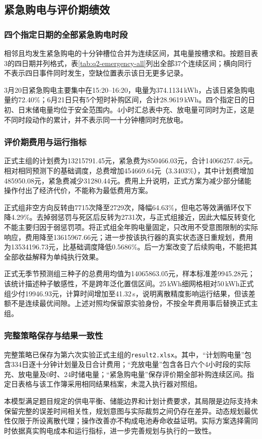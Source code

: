 
\subsection{紧急购电与评价期绩效}
\subsubsection{四个指定日期的全部紧急购电时段}

相邻且均发生紧急购电的十分钟槽位合并为连续区间，其电量按槽求和。按题目表3的四日期并列格式，表\ref{tab:q2-emergency-all}列出全部37个连续区间；横向同行不表示四日事件同时发生，空缺位置表示该日无更多记录。


3月20日紧急购电主要集中在15:20--16:20，电量为374.1134\,kWh，占该日紧急购电量约72.40\%；6月21日只有5个短时补购区间，合计28.9619\,kWh。四个指定日的日初、日末储电量均位于安全范围内。4小时汇总表中充、放电量可同时为正，这是不同时段动作的累计，并不表示同一十分钟槽同时充放电。

\subsubsection{评价期费用与运行指标}


正式主组的计划费为13215791.45元，紧急费为850466.03元，合计14066257.48元。相对相同预测下的基础调度，总费增加454669.64元（3.3403\%），其中计划费增加485950.08元，紧急费减少31280.44元。费用上升说明，正式方案为减少部分储能操作付出了经济代价，不能称为最低费用方案。

正式组非空方向反转由7715次降至2729次，降幅64.63\%，但电芯等效满循环仅下降4.29\%。去掉弱惩罚与死区后反转为2731次，与正式组接近，因此大幅反转变化不能主要归因于弱惩罚项。将正式组全年购电量固定，只改用不受意图限制的实际响应，费用降至13615967.66元；进一步按该执行器的真实状态逐日重规划，费用为13534196.73元，比基础调度降低0.5686\%。后一方案改变了后续购电，不能把其全部收益解释为单纯执行效果。

正式无季节预测组三种子的总费用均值为14065863.05元，样本标准差9945.28元；该统计描述种子敏感性，不是跨年泛化置信区间。25\,kWh细网格相对50\,kWh正式组少付19946.93元，计算时间增加至41.32\,s，说明离散精度影响运行结果，但该差额不是连续最优间隙。上述对照均保留原实验身份，不按全年费用事后替换正式主组。

\subsubsection{完整策略保存与结果一致性}

完整策略已保存为第六次实验正式主组的\texttt{result2.xlsx}。其中，“计划购电量”包含334日逐十分钟计划量及日合计费用；“充放电量”包含各日六个4小时段的实际充、放电量及0时、24时储电量；“紧急购电量”保存评价期全部补购连续区间。指定日表格与该工作簿采用相同结果档案，未混入执行器对照组。

本模型满足题目规定的供电平衡、储能边界和计划计费要求，其局限是边际支持未保留完整的误差时间相关性，规划意图与实际裁剪之间仍存在差异。动态规划最优性仅限于所设离散代理；操作改善亦不构成电池寿命收益证明。实际方案选择需同时依据真实购电成本和运行指标，进一步完善规划与执行的一致性。
\clearpage
